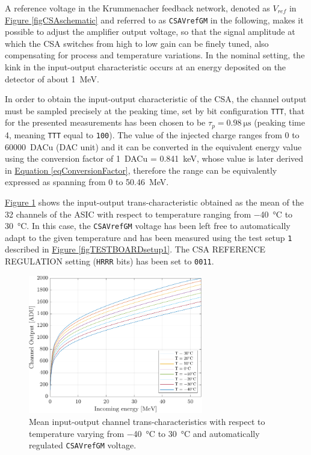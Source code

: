 \par
A reference voltage in the Krummenacher feedback network, denoted as $V_{ref}$ in \hyperref[figCSAschematic]{Figure \ref{figCSAschematic}} and referred to as \texttt{CSAVrefGM} in the following, makes it possible to adjust the amplifier output voltage, so that the signal amplitude at which the CSA switches from high to low gain can be finely tuned, also compensating for process and temperature variations. In the nominal setting, the kink in the input-output characteristic occurs at an energy deposited on the detector of about \SI{1}{\mega\electronvolt}.

\par
In order to obtain the input-output characteristic of the CSA, the channel output must be sampled precisely at the peaking time, set by bit configuration \texttt{TTT}, that for the presented measurements has been chosen to be $\tau_{p} = \SI{0.98}{\micro\second}$ (peaking time 4, meaning \texttt{TTT} equal to \texttt{100}). The value of the injected charge ranges from 0 to \SI{60000}{DACu} (DAC unit) and it can be converted in the equivalent energy value using the conversion factor of \SI{1}{DACu} = \SI{0.841}{\kilo\electronvolt}, whose value is later derived in \hyperref[eqConversionFactor]{Equation \ref{eqConversionFactor}}, therefore the range can be equivalently expressed as spanning from 0 to \SI{50.46}{\mega\electronvolt}.

\par
\hyperref[figFDTplotauto0011]{Figure \ref{figFDTplotauto0011}} shows the input-output trans-characteristic obtained as the mean of the 32 channels of the ASIC with respect to temperature ranging from \SI{-40}{\celsius} to \SI{30}{\celsius}. In this case, the \texttt{CSAVrefGM} voltage has been left free to automatically adapt to the given temperature and has been measured using the test setup \texttt{1} described in \hyperref[figTESTBOARDsetup1]{Figure \ref{figTESTBOARDsetup1}}. The CSA REFERENCE REGULATION setting (\texttt{HRRR} bits) has been set to \texttt{0011}.

\begin{figure}[h!]
    \centering
    \includegraphics[width=0.68\textwidth]{Images/chap1/results/FDT/fdt_csavrefgm_auto_tau6_keV_0011.pdf}
    \caption{Mean input-output channel trans-characteristics with respect to temperature varying from \SI{-40}{\celsius} to \SI{30}{\celsius} and automatically regulated \texttt{CSAVrefGM} voltage.}
    \label{figFDTplotauto0011}
\end{figure}

